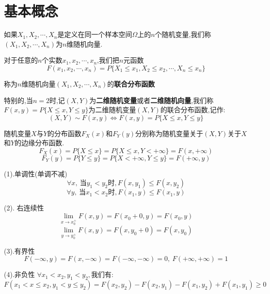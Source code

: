 \section{基本概念}
\begin{definition}[$n$维随机变量]
	如果$X_{1},X_{2},\cdots,X_{n}$是定义在同一个样本空间$\Omega$上的$n$个随机变量,我们称$(X_{1},X_{2},\cdots,X_{n})$为$n$维随机向量.
	
	对于任意的$n$个实数$x_{1},x_{2},\cdots,x_{n}$,我们把$n$元函数
	$$F(x_{1},x_{2},\cdots,x_{n})=P\{X_{1}\leq x_{1},X_{2}\leq x_{2},\cdots,X_{n}\leq x_{n}\}$$
	
	称为$n$维随机向量$(X_{1},X_{2},\cdots,X_{n})$的\textbf{联合分布函数}
	
	特别的,当$n=2$时,记$(X,Y)$为\textbf{二维随机变量}或者\textbf{二维随机向量},我们称$F(x,y)=P\{X\leq x,Y\leq y\}$为二维随机变量$(X,Y)$的联合分布函数,记作: 
	$$(X,Y)\sim F(x,y)\Leftrightarrow F(x,y)=P\{X\leq x,Y\leq y\}$$
	
	随机变量$X$与$Y$的分布函数$F_{X}(x)$和$F_{Y}(y)$分别称为随机变量关于$(X,Y)$关于$X$和$Y$的边缘分布函数.
	$$F_{X}(x)=P\{X\leq x\}=P\{X\leq x,Y< +\infty\}=F(x,+\infty)$$
	$$F_{Y}(y)=P\{Y\leq y\}=P\{X<+\infty,Y\leq y\}=F(+\infty,y)$$
	\begin{anymark}[注]
		
		(1).单调性(单调不减)
		$$\forall x,\ \text{当}y_{1}<y_{2}\text{时},F(x,y_{1})\leq F(x,y_{2})$$
		$$\forall y,\ \text{当}x_{1}<x_{2}\text{时},F(x_{1},y)\leq F(x_{1},y)$$
		
		(2). 右连续性
		$$\lim\limits_{x\rightarrow x_{0}^{+}}F(x,y)=F(x_{0}+0,y)=F(x_{0},y)$$
		$$\lim\limits_{y\rightarrow y_{0}^{+}}F(x,y)=F(x,y_{0}+0)=F(x,y_{0})$$
		
		(3).有界性
		$$F(-\infty,y)=F(x,-\infty)=F(-\infty,-\infty)=0,\ F(+\infty,+\infty)=1$$
		
		(4).非负性
		$\forall x_{1}<x_{2},y_{1}<y_{2},\text{我们有}$: 
		$$F(x_{1}<x\leq x_{2},y_{1}<y\leq y_{2})=F(x_{2},y_{2})-F(x_{2},y_{1})-F(x_{1},y_{2})+F(x_{1},y_{1})\geq 0$$
	\end{anymark}
	
\end{definition}
